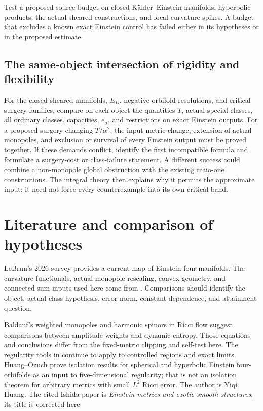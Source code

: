 \documentclass[11pt,a4paper]{article}
\theoremstyle{definition}
\theoremstyle{remark}
\numberwithin{equation}{section}
\begin{document}
Test a proposed source budget on closed K\"ahler--Einstein manifolds,
hyperbolic products, the actual sheared constructions, and local curvature
spikes. A budget that excludes a known exact Einstein control has failed
either in its hypotheses or in the proposed estimate.

\subsection{The same-object intersection of rigidity and flexibility}\label{sub:experiment-C}
For the closed sheared manifolds, $E_D$, negative-orbifold resolutions,
and critical surgery families, compare on each object the quantities
$T$, actual special classes, all ordinary classes, capacities,
$e_\sigma$, and restrictions on exact Einstein outputs.
For a proposed surgery changing $T/\alpha^2$, the input metric change,
extension of actual monopoles, and exclusion or survival of every
Einstein output must be proved together. If these demands conflict,
identify the first incompatible formula and formulate a surgery-cost
or class-failure statement. A different success could combine a
non-monopole global obstruction with the existing ratio-one
constructions. The integral theory then explains why it permits the
approximate input; it need not force every counterexample into its own
critical band.

\section{Literature and comparison of hypotheses}\label{sec:literature}
LeBrun's 2026 survey \cite{LeBrunSurvey} provides a current map of
Einstein four-manifolds. The curvature functionals, actual-monopole
rescaling, convex geometry, and connected-sum inputs used here come from
\cite{LeBrun01,LeBrunConvex,IL,Ishida,Kotschick}. Comparisons should
identify the object, actual class hypothesis, error norm, constant
dependence, and attainment question.

Baldauf's weighted monopoles and harmonic spinors in Ricci flow
\cite{Baldauf} suggest comparisons between amplitude weights and dynamic
entropy. Those equations and conclusions differ from the fixed-metric
clipping and self-test here. The regularity tools in \cite{CT,CN,JN}
continue to apply to controlled regions and exact limits. Huang--Ozuch
\cite{HO} prove isolation results for spherical and hyperbolic Einstein
four-orbifolds as an input to five-dimensional regularity; that is not an
isolation theorem for arbitrary metrics with small $L^2$ Ricci error.
The author is Yiqi Huang. The cited Ishida paper is \emph{Einstein metrics
and exotic smooth structures}; its title is corrected here.
\end{document}
